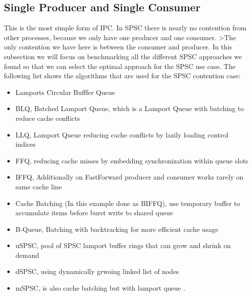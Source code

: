 \subsection{Single Producer and Single Consumer}\label{subsec:single-producer-and-single-consumer}
This is the most simple form of \ac{IPC}. In \ac{SPSC} there is nearly no contention from other processes, because we only have one producer and one consumer. >The only contention we have here is between the consumer and producer. In this subsection we will focus on benchmarking all the different \ac{SPSC} approaches we found so that we can select the optimal approach for the \ac{SPSC} use case. The following list shows the algorithms that are used for the \ac{SPSC} contention case:
\begin{itemize}
   \item Lamports Circular Bufffer Queue \cite{Lamport1983SPSCCircularBuffer,MaffioneCacheAware}
   \item \ac{BLQ}, Batched Lamport Queue, which is a Lamport Queue with batching to reduce cache conflicts \cite{MaffioneCacheAware}
   \item \ac{LLQ}, Lamport Queue reducing cache conflicts by lazily loading control indices \cite{MaffioneCacheAware}
   \item \ac{FFQ}, reducing cache misses by embedding synchronization within queue slots \cite{ffq}
   \item \ac{IFFQ}, Additionally on FastForward producer and consumer works rarely on same cache line \cite{MaffioneCacheAware}
   \item Cache Batching (In this example done as \ac{BIFFQ}), use temporary buffer to accumulate items before burst write to shared queue \cite{MaffioneCacheAware}
   \item B-Queue, Batching with backtracking for more efficient cache usage \cite{Wang2013BQueue}
   \item \ac{uSPSC}, pool of \ac{SPSC} lamport buffer rings that can grow and shrink on demand \cite{torquati2010singleproducersingleconsumerqueuessharedcache,Aldinucci2012EfficientSync}
   \item \ac{dSPSC}, using dynamically grwoing linked list of nodes \cite{torquati2010singleproducersingleconsumerqueuessharedcache,Aldinucci2012EfficientSync}
   \item \ac{mSPSC}, is also cache batching but with lamport queue \cite{torquati2010singleproducersingleconsumerqueuessharedcache}.
\end{itemize}

